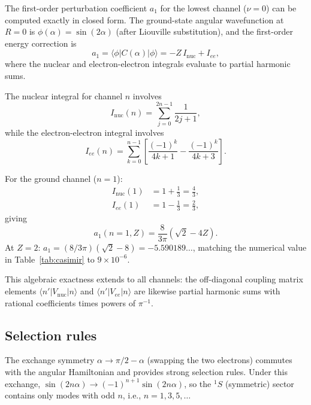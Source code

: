 \documentclass[aps,pra,twocolumn,superscriptaddress,longbibliography]{revtex4-2}
\begin{document}
The first-order perturbation coefficient $a_1$ for the lowest
channel ($\nu = 0$) can be computed exactly in closed form.  The
ground-state angular wavefunction at $R = 0$ is
$\phi(\alpha) = \sin(2\alpha)$ (after Liouville substitution),
and the first-order energy correction is
\begin{equation}
  a_1 = \langle \phi | C(\alpha) | \phi \rangle
  = -Z\,I_{\mathrm{nuc}} + I_{ee},
  \label{eq:a1_general}
\end{equation}
where the nuclear and electron-electron integrals evaluate to
partial harmonic sums.

The nuclear integral for channel $n$ involves
\begin{equation}
  I_{\mathrm{nuc}}(n) = \sum_{j=0}^{2n-1} \frac{1}{2j+1},
  \label{eq:I_nuc}
\end{equation}
while the electron-electron integral involves
\begin{equation}
  I_{ee}(n) = \sum_{k=0}^{n-1}
  \left[\frac{(-1)^k}{4k+1} - \frac{(-1)^k}{4k+3}\right].
  \label{eq:I_ee}
\end{equation}

For the ground channel ($n = 1$):
\begin{align}
  I_{\mathrm{nuc}}(1) &= 1 + \tfrac{1}{3} = \tfrac{4}{3}, \\
  I_{ee}(1) &= 1 - \tfrac{1}{3} = \tfrac{2}{3},
\end{align}
giving
\begin{equation}
  a_1(n{=}1, Z) = \frac{8}{3\pi}\!\left(\sqrt{2} - 4Z\right).
  \label{eq:a1_exact}
\end{equation}
At $Z = 2$: $a_1 = (8/3\pi)(\sqrt{2} - 8) = -5.590189\ldots$,
matching the numerical value in Table~\ref{tab:casimir} to
$9 \times 10^{-6}$.

This algebraic exactness extends to all channels: the off-diagonal
coupling matrix elements $\langle n' | V_{\mathrm{nuc}} | n \rangle$
and $\langle n' | V_{ee} | n \rangle$ are likewise partial harmonic
sums with rational coefficients times powers of $\pi^{-1}$.

\subsection{Selection rules}
\label{sec:selection_rules}

The exchange symmetry $\alpha \to \pi/2 - \alpha$ (swapping the two
electrons) commutes with the angular Hamiltonian and provides strong
selection rules.  Under this exchange, $\sin(2n\alpha) \to
(-1)^{n+1}\sin(2n\alpha)$, so the ${}^1S$ (symmetric) sector
contains only modes with odd $n$, i.e., $n = 1, 3, 5, \ldots$
\end{document}
